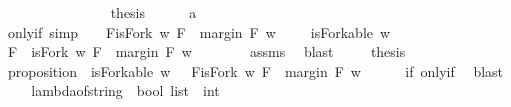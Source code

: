 \begin{isabellebody}
\ \ \ \ \isamarkupfalse%
\ \ \ \ \ \isanewline
\ \ \isamarkupfalse%
\ \isamarkupfalse%
\ {\isacharquery}thesis\isanewline
\ \ \ \ \isamarkupfalse%
\ a\ \isamarkupfalse%
\ \isanewline
{}\isamarkupfalse%
%
\endisatagproof
{\isafoldproof}%
%
\isadelimproof
\isanewline
%
\endisadelimproof
\ \ \isanewline
{}\isamarkupfalse%
\ only{\isacharunderscore}if{\isacharunderscore}{}{\isacharunderscore}{}{}\ {\isacharbrackleft}simp{\isacharbrackright}{\isacharcolon}\ \ \ {\isachardoublequoteopen}{\isacharparenleft}{\isasymexists}\ F{\isachardot}{\isacharparenleft}isFork\ w\ F\ {\isasymand}\ margin\ F\ w\ {\isasymge}\ {}{\isacharparenright}{\isacharparenright}{\isachardoublequoteclose}\ \ {\isachardoublequoteopen}\ isForkable\ w{\isachardoublequoteclose}\isanewline
%
\isadelimproof
%
\endisadelimproof
%
\isatagproof
{}\isamarkupfalse%
\ {\isacharminus}\isanewline
\ \ \isamarkupfalse%
\ F\ \ {\isachardoublequoteopen}isFork\ w\ F\ {\isasymand}\ margin\ F\ w\ {\isasymge}\ {}{\isachardoublequoteclose}\isanewline
\ \ \ \ \isamarkupfalse%
\ assms\ \isamarkupfalse%
\ blast\ \isanewline
\ \ \isamarkupfalse%
\ {\isacharquery}thesis\ \isamarkupfalse%
\ \ \isanewline
{}\isamarkupfalse%
%
\endisatagproof
{\isafoldproof}%
%
\isadelimproof
\isanewline
%
\endisadelimproof
\ \ \isanewline
{}\isamarkupfalse%
\ proposition{\isacharunderscore}{}{\isacharunderscore}{}{}\ {\isacharcolon}\ {\isachardoublequoteopen}isForkable\ w\ {\isasymlongleftrightarrow}\ {\isacharparenleft}{\isasymexists}\ F{\isachardot}{\isacharparenleft}isFork\ w\ F\ {\isasymand}\ margin\ F\ w\ {\isasymge}\ {}{\isacharparenright}{\isacharparenright}{\isachardoublequoteclose}\isanewline
%
\isadelimproof
\ \ %
\endisadelimproof
%
\isatagproof
{}\isamarkupfalse%
\ if{\isacharunderscore}{}{\isacharunderscore}{}{}\ only{\isacharunderscore}if{\isacharunderscore}{}{\isacharunderscore}{}{}\ \isamarkupfalse%
\ blast%
\endisatagproof
{\isafoldproof}%
%
\isadelimproof
\ \isanewline
%
\endisadelimproof
\ \isanewline
{}\isamarkupfalse%
\ lambda{\isacharunderscore}of{\isacharunderscore}string\ {\isacharcolon}{\isacharcolon}\ {\isachardoublequoteopen}bool\ list\ {\isasymRightarrow}\ int{\isachardoublequoteclose}\ \ \ \ \isanewline

\end{isabellebody}

